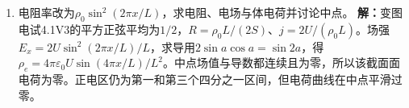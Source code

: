 \documentclass[UTF8,fontset=fandol,a4paper,11pt]{ctexart}
\begin{document}
\begin{enumerate}
\item 电阻率改为$\rho_0\sin^2(2\pi x/L)$，求电阻、电场与体电荷并讨论中点。
\textbf{解：}变图电试4.1V3的平方正弦平均为$1/2$，$R=\rho_0L/(2S)$、$j=2U/(\rho_0L)$。场强$E_x=2U\sin^2(2\pi x/L)/L$，求导用$2\sin a\cos a=\sin2a$，得$\rho_e=4\pi\varepsilon_0U\sin(4\pi x/L)/L^2$。中点场值与导数都连续且为零，所以该截面面电荷为零。正电区仍为第一和第三个四分之一区间，但电荷曲线在中点平滑过零。
\begin{center}\begin{minipage}{.98\linewidth}\centering
{}
\end{minipage}
\end{center}
\end{enumerate}
\end{document}
